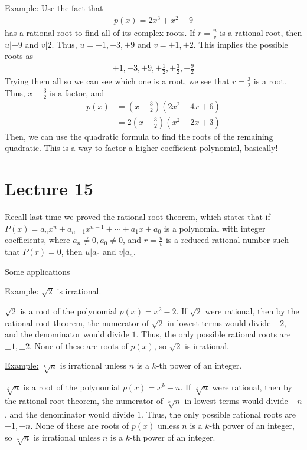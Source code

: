 \documentclass{article}
\begin{document}
\underline{Example:} Use the fact that \begin{align*}
    p(x)=2x^3+x^2-9
\end{align*}has a rational root to find all of its complex roots. If $r=\frac{u}{v}$ is a rational root, then $u|-9$ and $v|2$. Thus, $u=\pm 1,\pm 3, \pm 9$ and $v=\pm 1, \pm 2$. This implies the possible roots as \begin{align*}
    \pm 1,\pm 3, \pm 9, \pm \frac{1}{2}, \pm \frac{3}{2}, \pm \frac{9}{2}
\end{align*}Trying them all so we can see which one is a root, we see that $r=\frac{3}{2}$ is a root. Thus, $x-\frac{3}{2}$ is a factor, and \begin{align*}
    p(x) &= (x-\frac{3}{2})(2x^2+4x+6) \\
         &= 2(x-\frac{3}{2})(x^2+2x+3)
\end{align*}Then, we can use the quadratic formula to find the roots of the remaining quadratic. This is a way to factor a higher coefficient polynomial, basically!

\section{Lecture 15}

Recall last time we proved the rational root theorem, which states that if $P(x)=a_nx^n+a_{n-1}x^{n-1}+\cdots + a_1x + a_0$ is a polynomial with integer coefficients, where $a_n\neq 0, a_0\neq 0$, and $r=\frac{u}{v}$ is a reduced rational number such that $P(r)=0$, then $u|a_0$ and $v|a_n$.

Some applications

\underline{Example:} $\sqrt{2}$ is irrational. 

$\sqrt{2}$ is a root of the polynomial $p(x)=x^2-2$. If $\sqrt{2}$ were rational, then by the rational root theorem, the numerator of $\sqrt{2}$ in lowest terms would divide $-2$, and the denominator would divide $1$. Thus, the only possible rational roots are $\pm 1, \pm 2$. None of these are roots of $p(x)$, so $\sqrt{2}$ is irrational.

\underline{Example:} $\sqrt[k]{n}$ is irrational unless $n$ is a $k$-th power of an integer.

$\sqrt[k]{n}$ is a root of the polynomial $p(x)=x^k-n$. If $\sqrt[k]{n}$ were rational, then by the rational root theorem, the numerator of $\sqrt[k]{n}$ in lowest terms would divide $-n$, and the denominator would divide $1$. Thus, the only possible rational roots are $\pm 1, \pm n$. None of these are roots of $p(x)$ unless $n$ is a $k$-th power of an integer, so $\sqrt[k]{n}$ is irrational unless $n$ is a $k$-th power of an integer.
\end{document}
